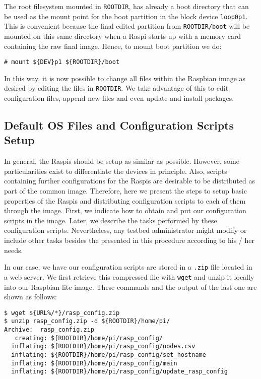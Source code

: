The root filesystem mounted in \texttt{ROOTDIR}, has already a boot
directory that can be used as the mount point for the boot partition
in the block device \texttt{loop0p1}. This is convenient because
the final edited partition from \texttt{ROOTDIR/boot} will be mounted on
this same directory when a \ac{Raspi} starts up with a memory card
containing the raw final image. Hence, to mount boot partition we do:

\begin{lstlisting}[]
# mount ${DEV}p1 ${ROOTDIR}/boot
\end{lstlisting}
\FloatBarrier
\vspace{-5mm}

In this way, it is now possible to change all files within the Raspbian
image as desired by editing the files in \texttt{ROOTDIR}. We take
advantage of this to edit configuration files, append new files and even
update and install packages.

\subsection{Default OS Files and Configuration Scripts Setup}

In general, the \ac{Raspi}s should be setup as similar as possible. However,
some particularities exist to differentiate the devices in principle. Also,
scripts containing further configurations for the \ac{Raspi}s are desirable
to be distributed as part of the common image. Therefore, here we present
the steps to setup basic properties of the \ac{Raspi}s and distributing
configuration scripts to each of them through the image. First, we indicate
how to obtain and put our configuration scripts in the image. Later, we
describe the tasks performed by these configuration scripts. Nevertheless,
any testbed administrator might modify or include other tasks besides the
presented in this procedure according to his / her needs.

In our case, we have our configuration scripts are stored in a \texttt{.zip}
file located in a web server. We first retrieve this compressed file with
\texttt{wget} and unzip it locally into our Raspbian lite image. These
commands and the output of the last one are shown as follows:

\begin{lstlisting}[]
$ wget ${URL%/*}/rasp_config.zip
$ unzip rasp_config.zip -d ${ROOTDIR}/home/pi/
Archive:  rasp_config.zip
   creating: ${ROOTDIR}/home/pi/rasp_config/
  inflating: ${ROOTDIR}/home/pi/rasp_config/nodes.csv
  inflating: ${ROOTDIR}/home/pi/rasp_config/set_hostname
  inflating: ${ROOTDIR}/home/pi/rasp_config/main
  inflating: ${ROOTDIR}/home/pi/rasp_config/update_rasp_config
\end{lstlisting}
\FloatBarrier
\vspace{-5mm}

